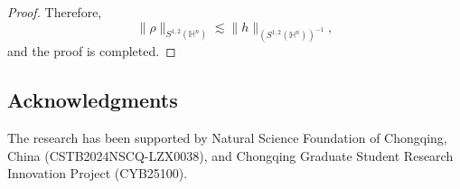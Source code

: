 \documentclass[11pt]{article}
\begin{document}
\begin{proof}
Therefore,
  \begin{equation*}
    \|\rho\|_{S^{1,2}(\mathbb{H}^{n})}  \lesssim \|h\|_{(S^{1,2}(\mathbb{H}^{n}))^{-1}},
  \end{equation*}
   and the proof is completed.
\end{proof}














\subsection*{Acknowledgments}
The research has been supported by Natural Science Foundation of Chongqing, China (CSTB2024NSCQ-LZX0038), and Chongqing Graduate Student Research Innovation Project
(CYB25100).
\end{document}
